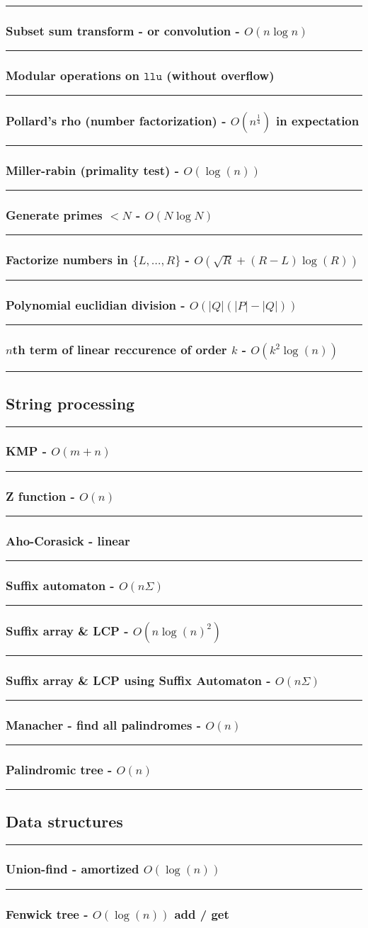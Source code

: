 \documentclass[landscape,a4paper,twocolumn,10pt]{report}
\renewcommand{\line}{\noindent\rule{\linewidth}{1pt}}
\newcommand{\algosection}[1]{\line \subsection*{#1}}
\newcommand{\algorithm}[1]{\line \subsubsection*{#1}}
\begin{document}
\algorithm{Subset sum transform - or convolution - $O(n \log n)$}


\algorithm{Modular operations on $\texttt{llu}$ (without overflow)}


\algorithm{Pollard's rho (number factorization) - $O(n^{\frac{1}{4}})$ in expectation}


\algorithm{Miller-rabin (primality test) - $O(\log(n))$}


\algorithm{Generate primes $< N$ - $O(N \log N)$}


\algorithm{Factorize numbers in $\{L, \dots, R\}$ - $O(\sqrt{R} + (R-L) \log(R))$}


\algorithm{Polynomial euclidian division - $O(|Q|(|P|-|Q|))$}


\algorithm{$n$th term of linear reccurence of order $k$ - $O(k^2 \log(n))$}


\algosection{String processing}
\label{string}

\algorithm{KMP - $O(m+n)$}


\algorithm{Z function - $O(n)$}


\algorithm{Aho-Corasick - linear}


\algorithm{Suffix automaton - $O(n \Sigma)$}


\algorithm{Suffix array \& LCP - $O(n \log(n)^2)$}


\algorithm{Suffix array \& LCP using Suffix Automaton - $O(n \Sigma)$}


\algorithm{Manacher - find all palindromes - $O(n)$}


\algorithm{Palindromic tree - $O(n)$}


\algosection{Data structures}
\label{datastruct}

\algorithm{Union-find - amortized $O(\log(n))$}


\algorithm{Fenwick tree - $O(\log(n))$ add / get}

\end{document}
